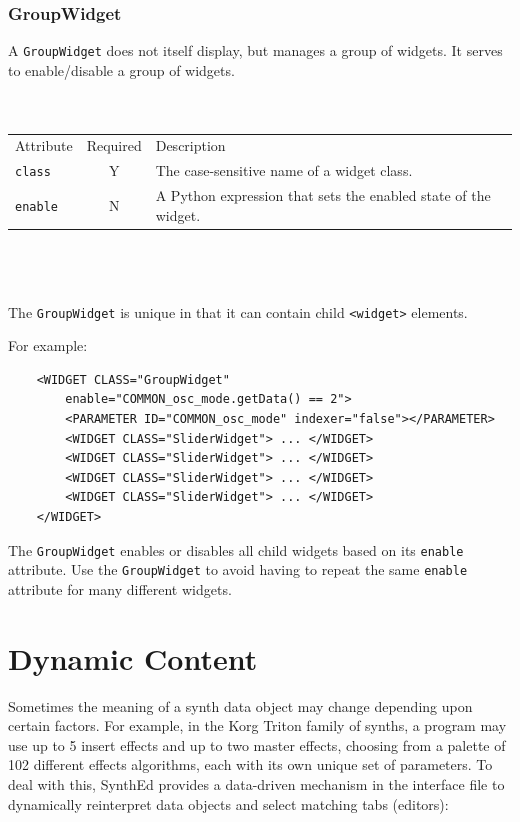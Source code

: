 \documentclass[a4paper,twoside,12pt]{article}
\newcommand{\code}[1]{\color{red}\texttt{#1}\color{black}}
\begin{document}
\subsubsection{GroupWidget}
A \code{GroupWidget}{} does not itself display, but manages a
group of widgets. It serves to enable/disable a group of widgets.
\\
\\
\\
\begin{tabular}{|l|c|p{9cm}|}
\hline
Attribute & Required & Description \\
\code{class} & Y & The case-sensitive name of a widget class. \\
\code{enable} & N & A Python expression that sets the enabled
state of the widget. \\
\hline
\end{tabular}
\\
\\
\\
The \code{GroupWidget}{} is unique in that it can contain child
\code{<widget>}{} elements.

 For example:
\begin{verbatim}
    <WIDGET CLASS="GroupWidget"
        enable="COMMON_osc_mode.getData() == 2">
        <PARAMETER ID="COMMON_osc_mode" indexer="false"></PARAMETER>
        <WIDGET CLASS="SliderWidget"> ... </WIDGET>
        <WIDGET CLASS="SliderWidget"> ... </WIDGET>
        <WIDGET CLASS="SliderWidget"> ... </WIDGET>
        <WIDGET CLASS="SliderWidget"> ... </WIDGET>
    </WIDGET>
\end{verbatim}

The \code{GroupWidget}{} enables or disables all child widgets
based on its \code{enable}{} attribute. Use the
\code{GroupWidget}{} to avoid having to repeat the same
\code{enable}{} attribute for many different widgets.

\section{Dynamic Content}\label{dynamic_content}

Sometimes the meaning of a synth data object may change depending
upon certain factors. For example, in the Korg Triton family of
synths, a program may use up to 5 insert effects and up to two
master effects, choosing from a palette of 102 different effects
algorithms, each with its own unique set of parameters. To deal
with this, SynthEd provides a data-driven mechanism in the
interface file to dynamically reinterpret data objects and select
matching tabs (editors):
\end{document}
